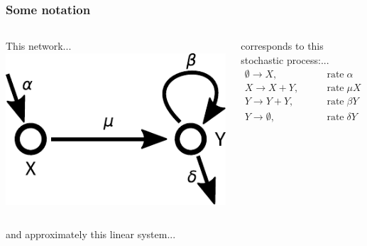 \documentclass{beamer}
\begin{document}
\begin{frame}
    \frametitle{Some notation}

    \begin{columns}
        \begin{column}{0.6\textwidth}
        This network...
        \includegraphics[width=\textwidth]{figures/diagram1}
        \end{column}
        \begin{column}{0.4\textwidth}
        corresponds to this stochastic process:...
        \begin{align}
            \emptyset \rightarrow X, &\qquad \mathrm{rate\;}\alpha
            \nonumber \\
            X \rightarrow X + Y, &\qquad\mathrm{rate\;}\mu X
            \nonumber \\
            Y \rightarrow Y + Y, &\qquad\mathrm{rate\;} \beta Y
            \nonumber \\
            Y \rightarrow \emptyset, &\qquad\mathrm{rate\;} \delta Y
            \nonumber
        \end{align}
        \end{column}
    \end{columns}

    and approximately this linear system...


\end{frame}
\end{document}

